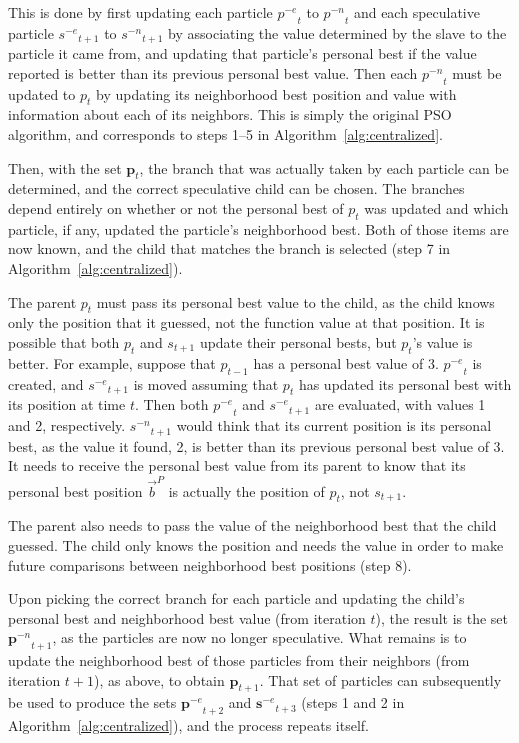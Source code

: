 \documentclass[journal,letterpaper]{IEEEtran}
\newcommand{\alg}[1]{Algorithm~\ref{alg:#1}}
\providecommand{\pers}{\ensuremath{P}}
\providecommand{\pbest}{\ensuremath{\Vec{b}^\pers}}
\providecommand{\noeval}[1]{\ensuremath{#1^{-e}}}
\providecommand{\nonbest}[1]{\ensuremath{#1^{-n}}}
\providecommand{\p}{\ensuremath{p}}
\providecommand{\pset}{\ensuremath{\mathbf{p}}}
\providecommand{\s}{\ensuremath{s}}
\providecommand{\sset}{\ensuremath{\mathbf{s}}}
\begin{document}
This is done by first updating each particle $\noeval{\p}_t$ to
$\nonbest{\p}_t$ and each speculative particle $\noeval{\s}_{t+1}$ to
$\nonbest{\s}_{t+1}$ by associating the value determined by the slave to the
particle it came from, and updating that particle's personal best if the value
reported is better than its previous personal best value.  Then each
$\nonbest{\p}_t$ must be updated to $\p_t$ by updating its neighborhood best
position and value with information about each of its neighbors.  This is
simply the original PSO algorithm, and corresponds to steps 1--5 in
\alg{centralized}.

Then, with the set $\pset_t$, the branch that was actually taken by each
particle can be determined, and the correct speculative child can be chosen.
The branches depend entirely on whether or not the personal best of $p_t$ was
updated and which particle, if any, updated the particle's neighborhood best.
Both of those items are now known, and the child that matches the branch is
selected (step 7 in \alg{centralized}).

The parent $\p_t$ must pass its personal best value to the child, as the child
knows only the position that it guessed, not the function value at that
position.  It is possible that both $\p_t$ and $\s_{t+1}$ update their
personal bests, but $\p_t$'s value is better.  For example, suppose that
$\p_{t-1}$ has a personal best value of 3.  $\noeval{\p}_t$ is created, and
$\noeval{\s}_{t+1}$ is moved assuming that $\p_t$ has updated its personal
best with its position at time $t$.  Then both $\noeval{\p}_t$ and
$\noeval{\s}_{t+1}$ are evaluated, with values 1 and 2, respectively.
$\nonbest{\s}_{t+1}$ would think that its current position is its personal
best, as the value it found, 2, is better than its previous personal best
value of 3.  It needs to receive the personal best value from its parent to
know that its personal best position $\pbest$ is actually the position of
$\p_t$, not $\s_{t+1}$.

The parent also needs to pass the value of the neighborhood best that the child
guessed.  The child only knows the position and needs the value in order to
make future comparisons between neighborhood best positions (step 8).

Upon picking the correct branch for each particle and updating the child's
personal best and neighborhood best value (from iteration $t$), the result is
the set $\nonbest{\pset}_{t+1}$, as the particles are now no longer
speculative.  What remains is to update the neighborhood best of those
particles from their neighbors (from iteration $t+1$), as above, to obtain
$\pset_{t+1}$.  That set of particles can subsequently be used to produce the
sets $\noeval{\pset}_{t+2}$ and $\noeval{\sset}_{t+3}$ (steps 1 and 2 in
\alg{centralized}), and the process repeats itself.
\end{document}
